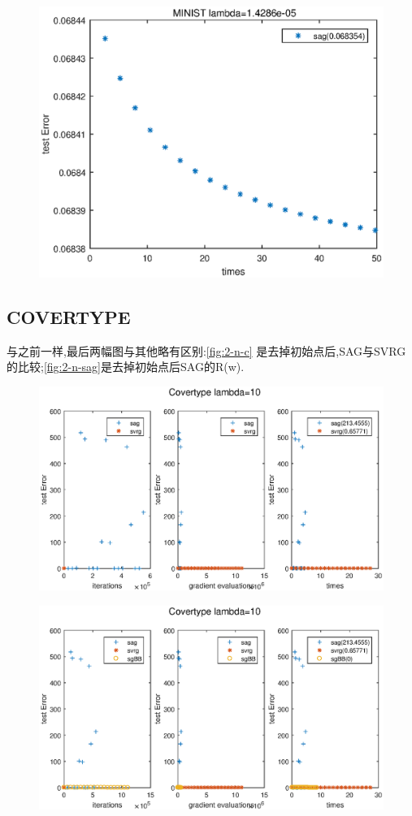 \documentclass[UTF8]{ctexart}
\begin{document}
\begin{figure}[htbp]
\centering\includegraphics[width=5in]{1-n-sag.eps}
\caption{}\label{fig:1-n-sag}
\end{figure}

\subsection{COVERTYPE}

与之前一样,最后两幅图与其他略有区别:\ref{fig:2-n-c} 是去掉初始点后,SAG与SVRG的比较;\ref{fig:2-n-sag}是去掉初始点后SAG的R(w).
\begin{figure}[htbp]
\centering\includegraphics[width=5in]{2-10-a.eps}
\label{fig:2-10-a}
\end{figure}
\begin{figure}[htbp]
\centering\includegraphics[width=5in]{2-10-b.eps}
\label{fig:2-10-b}
\end{figure}
\end{document}
